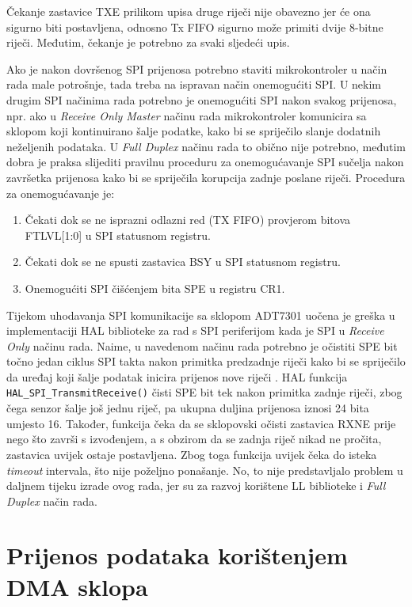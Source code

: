 		Čekanje zastavice TXE prilikom upisa druge riječi nije obavezno jer će ona sigurno biti postavljena, odnosno Tx FIFO sigurno može primiti dvije 8-bitne riječi. Međutim, čekanje je potrebno za svaki sljedeći upis.
	
		Ako je nakon dovršenog SPI prijenosa potrebno staviti mikrokontroler u način rada male potrošnje, tada treba na ispravan način onemogućiti SPI. U nekim drugim SPI načinima rada potrebno je onemogućiti SPI nakon svakog prijenosa, npr. ako u \textit{Receive Only Master} načinu rada mikrokontroler komunicira sa sklopom koji kontinuirano šalje podatke, kako bi se spriječilo slanje dodatnih neželjenih podataka. U \textit{Full Duplex} načinu rada to obično nije potrebno, međutim dobra je praksa slijediti pravilnu proceduru za onemogućavanje SPI sučelja nakon završetka prijenosa kako bi se spriječila korupcija zadnje poslane riječi. Procedura za onemogućavanje je:
		
		\begin{enumerate}
			\item Čekati dok se ne isprazni odlazni red (TX FIFO) provjerom bitova FTLVL[1:0] u SPI statusnom registru.
			\item Čekati dok se ne spusti zastavica BSY u SPI statusnom registru.
			\item Onemogućiti SPI čišćenjem bita SPE u registru CR1.
		\end{enumerate}
		
		Tijekom uhodavanja SPI komunikacije sa sklopom ADT7301 uočena je greška u implementaciji HAL biblioteke za rad s SPI periferijom kada je SPI u \textit{Receive Only} načinu rada. Naime, u navedenom načinu rada potrebno je očistiti SPE bit točno jedan ciklus SPI takta nakon primitka predzadnje riječi kako bi se spriječilo da uređaj koji šalje podatak inicira prijenos nove riječi \cite[str.~894]{stm32f4_manual}. HAL funkcija \texttt{HAL\_SPI\_TransmitReceive()} čisti SPE bit tek nakon primitka zadnje riječi, zbog čega senzor šalje još jednu riječ, pa ukupna duljina prijenosa iznosi 24 bita umjesto 16. Također, funkcija čeka da se sklopovski očisti zastavica RXNE prije nego što završi s izvođenjem, a s obzirom da se zadnja riječ nikad ne pročita, zastavica uvijek ostaje postavljena. Zbog toga funkcija uvijek čeka do isteka \textit{timeout} intervala, što nije poželjno ponašanje. No, to nije predstavljalo problem u daljnem tijeku izrade ovog rada, jer su za razvoj korištene LL biblioteke i \textit{Full Duplex} način rada.
		
	\section{Prijenos podataka korištenjem DMA sklopa}
		

